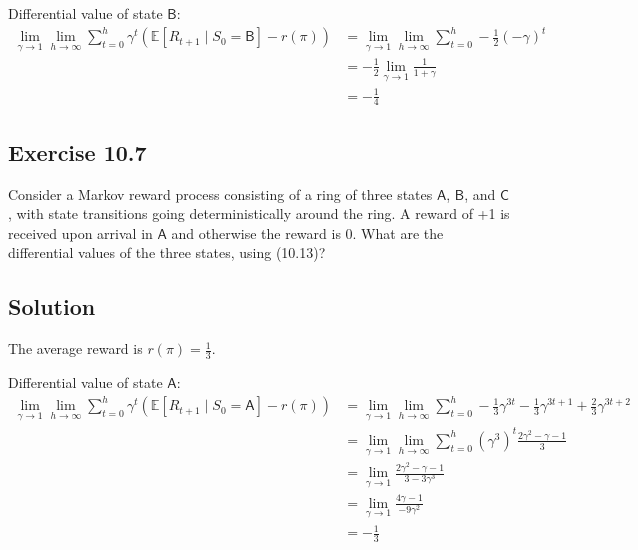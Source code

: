 Differential value of state $\mathsf{B}$:
\begin{align*}
    \lim_{\gamma \rightarrow 1} \lim_{h \rightarrow \infty} \sum_{t=0}^{h} \gamma^t \left( \mathbb{E} \left[ R_{t+1} \mid S_0 = \mathsf{B} \right] - r(\pi) \right) &=  \lim_{\gamma \rightarrow 1} \lim_{h \rightarrow \infty} \sum_{t=0}^{h} -\frac{1}{2}\left(-\gamma\right)^t \\
    &= -\frac{1}{2}\lim_{\gamma \rightarrow 1} \frac{1}{1 + \gamma} \\
    &= -\frac{1}{4}
\end{align*}

\subsection*{Exercise 10.7}

Consider a Markov reward process consisting of a ring of three states $\mathsf{A}$, $\mathsf{B}$,
and $\mathsf{C}$, with state transitions going deterministically around the ring. A reward of +1 is
received upon arrival in $\mathsf{A}$ and otherwise the reward is 0. What are the differential values
of the three states, using (10.13)? 

\subsection*{Solution}
The average reward is $r(\pi)=\frac{1}{3}$.

Differential value of state $\mathsf{A}$:
\begin{align*}
    \lim_{\gamma \rightarrow 1} \lim_{h \rightarrow \infty} \sum_{t=0}^{h} \gamma^t \left( \mathbb{E} \left[ R_{t+1} \mid S_0 = \mathsf{A} \right] - r(\pi) \right) &=  \lim_{\gamma \rightarrow 1} \lim_{h \rightarrow \infty} \sum_{t=0}^{h} -\frac{1}{3} \gamma^{3t} -\frac{1}{3} \gamma^{3t+1}  + \frac{2}{3} \gamma^{3t+2} \\
    &= \lim_{\gamma \rightarrow 1} \lim_{h \rightarrow \infty} \sum_{t=0}^{h} (\gamma^3)^t \frac{2\gamma^2 - \gamma - 1}{3} \\
    &= \lim_{\gamma \rightarrow 1} \frac{2\gamma^2 - \gamma - 1}{3 - 3\gamma^3} \\
    &= \lim_{\gamma \rightarrow 1} \frac{4\gamma - 1}{-9\gamma^2} \\
    &= - \frac{1}{3}
\end{align*}

